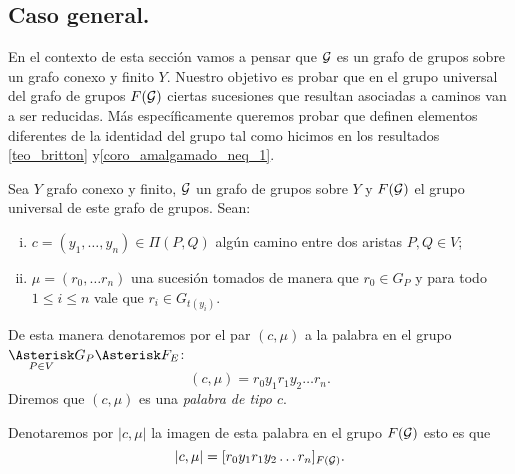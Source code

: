 \documentclass[tesis.tex]{subfiles}
\begin{document}
%


\subsection{ Caso general.}

En el contexto de esta sección vamos a pensar que ${\cal G}$ es un grafo de grupos sobre un grafo conexo y finito $Y$.
Nuestro objetivo es probar que en el grupo universal del grafo de grupos $F({\cal G})$ ciertas sucesiones que resultan asociadas a caminos van a ser reducidas.
Más específicamente queremos probar que definen elementos diferentes de la identidad del grupo tal como hicimos en los resultados \ref{teo_britton} y\ref{coro_amalgamado_neq_1}.



\begin{deff}
	Sea $Y$ grafo conexo y finito, ${\cal G}$ un grafo de grupos sobre $Y$ y $F({\cal G})$ el grupo universal de este grafo de grupos.
	Sean:
	\begin{enumerate}[i)]
		\item $c=(y_1, \dots, y_n) \in \Pi(P,Q)$ algún camino entre dos aristas $P,Q \in V$;
		\item $\mu = (r_0, \dots r_n)$ una sucesión tomados de manera que $r_0 \in G_P$ y para todo $ 1 \le i \le n $ vale que $r_i \in G_{t(y_i)}$.
	\end{enumerate}
	De esta manera denotaremos por el par $(c, \mu)$ a la palabra en el grupo $\underset{P \in V}{\Asterisk} G_P \Asterisk F_E$:
	\[
	(c,\mu) = r_0 y_1 r_1 y_2 \dots r_n.
	\]
	Diremos que $(c, \mu)$ es una \emph{palabra de tipo $c$}.
\end{deff}
 
Denotaremos por $|c,\mu|$ la imagen de esta palabra en el grupo $F({\cal G})$ esto es que
\[
|c,\mu| = [r_0 y_1 r_1 y_2 \dots r_n]_{F({\cal G})}.
\]
\end{document}
